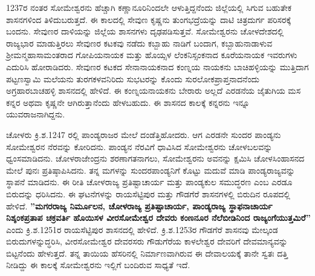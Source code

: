 1237ರ ನಂತರ ಸೋಮೇಶ್ವರನು ಹೆಚ್ಚಾಗಿ ಕಣ್ಣಾನೂರಿನಿಂದಲೇ ಆಳುತ್ತಿದ್ದನೆಂದು ಜಿಲ್ಲೆಯಲ್ಲಿ ಸಿಗುವ ಬಹುತೇಕ ಶಾಸನಗಳಿಂದ ತಿಳಿದುಬರುತ್ತದೆ. ಈ ಕಾಲದಲ್ಲಿ ಸೇವುಣ ಕೃಷ್ಣನು ತುಂಗಭದ್ರೆಯನ್ನು ದಾಟಿ ಚಿತ್ರದುರ್ಗ ಪರಿಸರಕ್ಕೆ ಬಂದನು. ಸೇವುಣರ ದಾಳಿಯನ್ನು ಜಿಲ್ಲೆಯ ಶಾಸನಗಳು ದೃಢಪಡಿಸುತ್ತವೆ. ಸೋಮೇಶ್ವರನು ಚೋಳದೇಶದಲ್ಲಿ ರಾಜ್ಯಭಾರ ಮಾಡುತ್ತಿರಲು ಸೇವುಣರ ಕಟಕವು ನಡೆದು ಕಬ್ಬಾಹು ನಾಡಿಗೆ ಬಂದಾಗ, ಕಬ್ಬಾಹುನಾಡಾಳುವ ಶ‍್ರೀಮನ್ಮಹಾಸಾಮಂತರಾದ ಗೋಪಿಯನಾಯಕ ಮತ್ತು ಹೊಯ್ಸಳ ಲೆಂಕನಿಸ್ಸಂಕನಾದ ಕೂರೆಯನಾಯಕ ಇವರುಗಳು ಎದುರಿಸಿ ಹೋರಾಡಿದರು. ಸೇವುಣರ ಕಟಕದ ಸೇನಾನಾಯಕನಾದ ಕಂಣ್ನಯ ನಾಯಕನು ಬಾಚಿಹಳ್ಳಿಯನ್ನು ಮುತ್ತಿದಾಗ ಪಟ್ಟಣಸ್ವಾಮಿ ಮಲೆಯನು ತುರಗಕಳವನಿರಿದು ಸುಭಟರನ್ನು ಕೊಂದು ಸುರಲೋಕಪ್ರಾಪ್ತನಾದನೆಂದು ಅಗ್ರಹಾರಬಾಚಹಳ್ಳಿ ಶಾಸನದಲ್ಲಿ ಹೇಳಿದೆ. ಈ ಕಂಣ್ನಯನಾಯಕನು ಬೇರಾರು ಅಲ್ಲದೆ ಎರಡನೆಯ ಜೈತುಗಿಯ ಮಸ ಕನ್ನರ ಅಥವಾ ಕೃಷ್ಣನೇ ಆಗಿರುತ್ತಾನೆಂದು ಹೇಳಬಹುದು. ಈ ಶಾಸನದ ಕಾಲಕ್ಕೆ ಕನ್ನರನು ಇನ್ನೂ ಯುವರಾಜನಾಗಿದ್ದನು. 

ಚೋಳರು ಕ್ರಿ.ಶ.1247 ರಲ್ಲಿ ಪಾಂಡ್ಯರಾಜರ ಮೇಲೆ ದಂಡೆತ್ತಿಹೋದರು. ಆಗ ಎರಡನೇ ಸುಂದರ ಪಾಂಡ್ಯನು ಸೋಮೇಶ್ವರನ ನೆರವನ್ನು ಕೋರಿದನು. ಪಾಂಡ್ಯನ ನೆರವಿಗೆ ಧಾವಿಸಿದ ಸೋಮೇಶ್ವರನು ಚೋಳಬಲವನ್ನು ಧ್ವಂಸಮಾಡಿದನು. ಚೋಳರಾಜೇಂದ್ರನು ಶರಣಾಗತನಾಗಲು, ಸೋಮೇಶ್ವರನು ಅವನನ್ನು ಕ್ಷಮಿಸಿ ಚೋಳಸಿಂಹಾಸನದ ಮೇಲೆ ಪುನಃ ಪ್ರತಿಷ್ಠಾಪಿ\-ಸಿದನು. ತನ್ನ ಮಗಳನ್ನು ಸುಂದರಪಾಂಡ್ಯನಿಗೆ ಕೊಟ್ಟು ಮದುವೆ ಮಾಡಿ ಪಾಂಡ್ಯರಾಜ್ಯವನ್ನು ಸ್ಥಾಪನೆ ಮಾಡಿದನು. ಈ ರೀತಿ ಚೋಳರಾಜ್ಯ ಪ್ರತಿಷ್ಟಾಚಾರ್ಯ ಮತ್ತು ಪಾಂಡ್ಯಕುಲ ಸಮುದ್ಧರಣ ಎಂಬ ಎರಡೂ ಬಿರುದನ್ನು ಧರಿಸಿದನು. ಈ ಘಟನೆಗಳನ್ನು ರಾಯಸೆಟ್ಟಿಪುರ ಮತ್ತು ಗೌಡಗೆರೆ ಶಾಸನಗಳಲ್ಲಿ ಬಿರುದಿನ ರೂಪದಲ್ಲಿ ಹೇಳಿದೆ. \textbf{''ಮಗರರಾಜ್ಯ ನಿರ್ಮೂಲನ, ಚೋಳರಾಜ್ಯ ಪ್ರತಿಷ್ಟಾಚಾರ್ಯ, ಪಾಂಡ್ಯರಾಜ್ಯ ಸ್ಥಾಫನಾಚಾರ್ಯ ನಿಶ್ಶಂಕಪ್ರತಾಪ ಚಕ್ರವರ್ತಿ ಹೊಯಿಸಳ ವೀರಸೋಮೇಶ್ವರ ದೇವರು ಕಂಣನೂರ ನೆಲೆಬೀಡಿನಿಂದ ರಾಜ್ಯಂಗೆಯುತ್ತಮಿರೆ''} ಎಂದು ಕ್ರಿ.ಶ.1251ರ ರಾಯಸೆಟ್ಟಿಪುರ ಶಾಸನದಲ್ಲಿ ಹೇಳಿದೆ. ಕ್ರಿ.ಶ.1253ರ ಗೌಡಗೆರೆ ಶಾಸನವು ಮೇಲ್ಕಂಡ ಬಿರುದುಗಳನ್ನುದ್ಧರಿಸಿ, ವೀರಸೋಮೇಶ್ವರ ದೇವರಸರು ಗೌಡುಗೆರೆಯ ಕಾಳಲೇಶ್ವರ ದೇವರಿಗೆ ದೇವಮಾನ್ಯವನ್ನು ಬಿಟ್ಟನೆಂದು ಹೇಳುತ್ತದೆ. ತನ್ನ ತಾಯಿಯ ಹೆಸರಿನಲ್ಲಿ ನಿರ್ಮಾಣವಾಗಿರುವ ಈ ದೇವಾಲಯಕ್ಕೆ ತಾನೇ ಸ್ವತಃ ದತ್ತಿ ನೀಡಿದ್ದು ಈ ಕಾಲಕ್ಕೆ ಸೋಮೇಶ್ವರನು ಇಲ್ಲಿಗೆ ಬಂದಿರುವ ಸಾಧ್ಯತೆ ಇದೆ.

